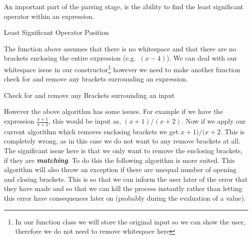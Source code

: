\documentclass{report}
\newcounter{subsubsubsection}[subsubsection]
\begin{document}
\newpage
{}
An important part of the parsing stage, is the ability to find the least significant operator within an expression.
\begin{algorithm}[H]
\caption{Least Significant Operator Position}
\DontPrintSemicolon
{}
\end{algorithm}
The function above assumes that there is no whitespace and that there are no brackets enclosing the entire expression (e.g.\ $(x-4)$). We can deal with our whitespace issue in our constructor\footnote{In our function class we will store the original input so we can show the user, therefore we do not need to remove whitespace here} however we need to make another function check for and remove any brackets surrounding an expression. 
\begin{algorithm}[H]
\DontPrintSemicolon
\caption{Check for and remove any Brackets surrounding an input}
\end{algorithm}
\newpage
However the above algorithm has some issues. For example if we have the expression $\frac{x+1}{x+2}$, this would be input as, $(x+1)/(x+2)$. Now if we apply our current algorithm which removes enclosing brackets we get $x+1)/(x+2$. This is completely wrong, as in this case we do not want to any remove brackets at all. The significant issue here is that we only want to remove the enclosing brackets, if they are \textit{\textbf{matching}}. To do this the following algorithm is more suited. This algorithm will also throw an exception if there are unequal number of opening and closing brackets. This is so that we can inform the user later of the error that they have made and so that we can kill the process instantly rather than letting this error have consequences later on (probably during the evaluation of a value).\\
\end{document}
